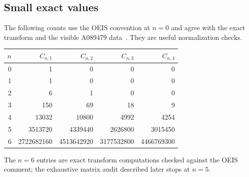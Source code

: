 \documentclass[11pt]{article}
\theoremstyle{definition}\newtheorem{definition}[theorem]{Definition}
\theoremstyle{remark}\newtheorem{remark}[theorem]{Remark}
\begin{document}
\subsection{Small exact values}
The following counts use the OEIS convention at $n=0$ and agree with the exact transform and the visible A089479 data~\cite{oeis}. They are useful normalization checks.
\begin{center}
\begin{tabular}{r r r r r}
\toprule
$n$ & $C_{n,1}$ & $C_{n,2}$ & $C_{n,3}$ & $C_{n,4}$\\
\midrule
0&1&0&0&0\\
1&1&0&0&0\\
2&6&1&0&0\\
3&150&69&18&9\\
4&13032&10800&4992&4254\\
5&3513720&4339440&2626800&3015450\\
6&2722682160&4513642920&3177532800&4466769300\\
\bottomrule
\end{tabular}
\end{center}
The $n=6$ entries are exact transform computations checked against the OEIS comment; the exhaustive matrix audit described later stops at $n=5$.
\end{document}
